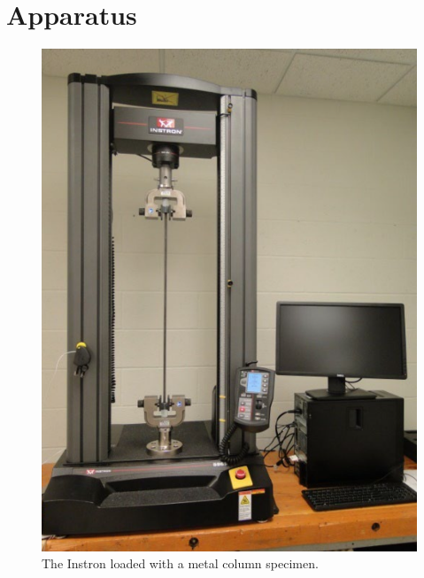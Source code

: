 \documentclass[12 pt]{article}
\begin{document}
\section{Apparatus} \label{apparatus}
\begin{figure}[htbp]
    \centering
    \begin{minipage}{0.45\textwidth}
        \centering
		\includegraphics[width=1.0\textwidth]{images/instron_1}
		\caption{The Instron loaded with a metal column specimen.}
		\label{fig:instron_1}
    \end{minipage}\hfill
    \begin{minipage}{0.45\textwidth}
        \centering

\end{minipage}
\end{figure}
\end{document}
